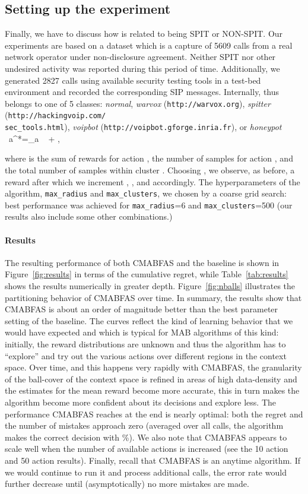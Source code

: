 \documentclass{llncs}
\newcommand{\argmax}{\mathop{\mathrm{argmax}}}
\begin{document}
\subsection{Setting up the experiment}
Finally, we have to discuss how  is related to being SPIT or NON-SPIT. 
Our experiments are based on a dataset which is a capture of 5609 calls from 
a real network operator under non-disclosure agreement. Neither SPIT nor 
other undesired activity was reported during this period of time. Additionally, we 
generated 2827 calls using available security testing tools in a test-bed environment 
and recorded the corresponding SIP messages. Internally,  thus belongs to one of 5 
classes: {\em normal}, {\em warvox} ({\tt http://warvox.org}), {\em spitter} ({\tt http://hackingvoip.com/\\sec\_tools.html}), 
{\em voipbot} ({\tt http://voipbot.gforge.inria.fr}), or {\em honeypot} \
a^*=\argmax_a \  + ,

where  is the sum of rewards for action ,  the number of samples
for action , and  the total number of samples within cluster . Choosing , we 
observe, as before, a reward  after which we increment , ,
and  accordingly. The hyperparameters of the algorithm, {\tt max\_radius} and {\tt max\_clusters},
we chosen by a coarse grid search: best performance was achieved for {\tt max\_radius}=6 and 
{\tt max\_clusters}=500 (our results also include some other combinations.)   


\paragraph{Results}
The resulting performance of both CMABFAS and the baseline is shown in Figure~\ref{fig:results} in terms 
of the cumulative regret, while Table~\ref{tab:results} shows the results numerically in greater depth. 
Figure~\ref{fig:nballs} illustrates the partitioning behavior of CMABFAS over time. In summary, the results
show that CMABFAS is about an order of magnitude better than the best parameter setting of the baseline. 
The curves reflect the kind of learning behavior that we would have expected and which is typical for MAB
algorithms of this kind: initially, the reward distributions are unknown and thus the algorithm has to ``explore'' and try out the various 
actions over different regions in the context space. Over time, and this happens very rapidly with CMABFAS, 
the granularity of the ball-cover of the context space is refined in areas of high data-density 
and the estimates for the mean reward become more accurate, this in turn makes the algorithm become more
confident about its decisions and explore less. The performance CMABFAS reaches at the end is nearly 
optimal: both the regret and the number of mistakes approach zero (averaged over all calls, the algorithm 
makes the correct decision with \%). We also note that CMABFAS appears to scale well when the 
number of available actions is increased (see the 10 action and 50 action results).
Finally, recall that CMABFAS is an anytime algorithm. If we 
would continue to run it and process additional calls, the error rate would further decrease until 
(asymptotically) no more mistakes are made.
\end{document}
